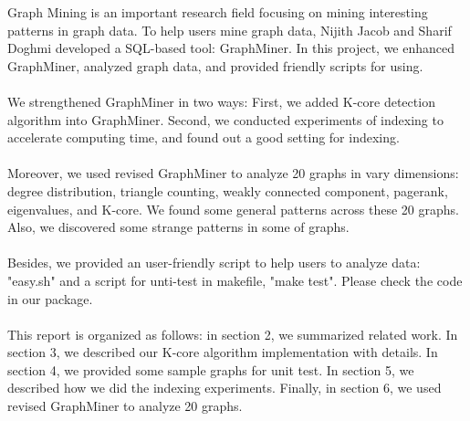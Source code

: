 Graph Mining is an important research field focusing on mining interesting patterns in graph data. To help users mine graph data, Nijith Jacob and Sharif Doghmi developed a SQL-based tool: GraphMiner. In this project, we enhanced GraphMiner, analyzed graph data, and provided friendly scripts for using.  
\\
\\
We strengthened GraphMiner in two ways: First, we added K-core detection algorithm into GraphMiner. Second, we conducted experiments of indexing to accelerate computing time, and found out a good setting for indexing. 
\\
\\
Moreover, we used revised GraphMiner to analyze 20 graphs in vary dimensions: degree distribution, triangle counting, weakly connected component, pagerank, eigenvalues, and K-core. We found some general patterns across these 20 graphs. Also, we discovered some strange patterns in some of graphs.
\\
\\
Besides, we provided an user-friendly script to help users to analyze data: "easy.sh" and a script for unti-test in makefile, "make test". Please check the code in our package.
\\
\\
This report is organized as follows: in section 2, we summarized related work. In section 3, we described our K-core algorithm implementation with details. In section 4, we provided some sample graphs for unit test. In section 5, we described how we did the indexing experiments. Finally, in section 6, we used revised GraphMiner to analyze 20 graphs. 